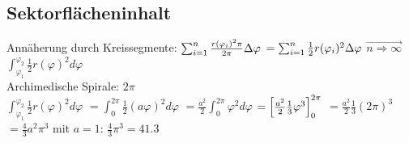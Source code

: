 \subsection{Sektorflächeninhalt}
Annäherung durch Kreissegmente: 
$\sum_{i=1}^{n} \frac{r(\varphi_i)^2 \pi}{2\pi} \Delta \varphi $
$=\sum_{i=1}^{n} \frac{1}{2} r(\varphi_i)^2 \Delta \varphi $
$\overrightarrow{n\Rightarrow \infty}$
$\int_{\varphi_1}^{\varphi_2} \frac{1}{2} r(\varphi)^2 d\varphi$\\

Archimedische Spirale: $2\pi$\\
$\int_{\varphi_1}^{\varphi_2} \frac{1}{2} r(\varphi)^2 d\varphi $
$= \int_{0}^{2\pi} \frac{1}{2} (a \varphi)^2 d\varphi$
$= \frac{a^2}{2} \int_{0}^{2\pi} \varphi^2 d\varphi$
$=  \left[  \frac{a^2}{2} \frac{1}{3} \varphi^3 \right] _0^{2\pi}$
$= \frac{a^2}{2} \frac{1}{3} (2\pi)^3$
$=\frac{4}{3} a^2 \pi^3 $ mit $a=1$: 
$ \frac{4}{3} \pi^3 = 41.3$
